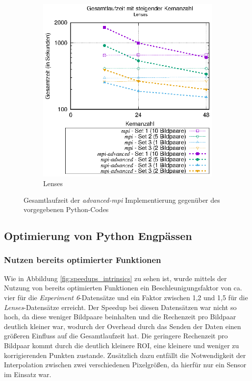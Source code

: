 \begin{center}
\begin{figure}[htbp]
\begin{subfigure}[b]{0.45\textwidth}
			\includegraphics[width=\textwidth]{pdf/mpi_advanced_times_lenses}
			\caption{Lenses}
			\label{fig:mpi_advanced_times_lenses}
		\end{subfigure}
		\caption{Gesamtlaufzeit der \textit{advanced-mpi} Implementierung gegenüber des vorgegebenen Python-Codes}
		\label{fig:mpi_advanced_times}
	\end{figure}
\end{center}

\subsection{Optimierung von Python Engpässen}

\subsubsection{Nutzen bereits optimierter Funktionen}

Wie in Abbildung \ref{fig:speedups_intrinsics} zu sehen ist, wurde mittels der Nutzung von bereits optimierten Funktionen ein Beschleunigungsfaktor von ca. vier für die \textit{Experiment 6}-Datensätze und ein Faktor zwischen 1,2 und 1,5 für die \textit{Lenses}-Datensätze erreicht. Der Speedup bei diesen Datensätzen war nicht so hoch, da diese weniger Bildpaare beinhalten und die Rechenzeit pro Bildpaar deutlich kleiner war, wodurch der Overhead durch das Senden der Daten einen größeren Einfluss auf die Gesamtlaufzeit hat. Die geringere Rechenzeit pro Bildpaar kommt durch die deutlich kleinere \gls{ROI}, eine kleinere   und weniger zu korrigierenden Punkten zustande. Zusätzlich dazu entfällt die Notwendigkeit der Interpolation zwischen zwei verschiedenen Pixelgrößen, da hierfür nur ein Sensor im Einsatz war.

